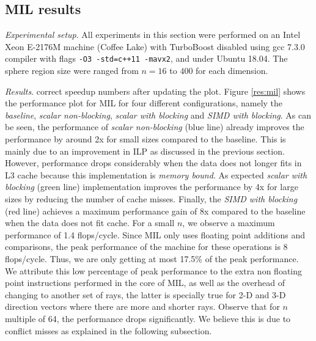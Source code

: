 \documentclass[letterpaper]{article}
\begin{document}
 

\subsection{MIL results} 
\textit{Experimental setup}. 
All experiments in this section were performed on an Intel Xeon E-2176M machine (Coffee Lake) with TurboBoost disabled using gcc 7.3.0 compiler with flags \texttt{-O3 -std=c++11 -mavx2}, and under Ubuntu 18.04. The sphere region size were ranged from $n=16$ to $400$ for each dimension.

\textit{Results}. 
{\color{red} correct speedup numbers after updating the plot.}
Figure \ref{res:mil} shows the performance plot for MIL for four different configurations, namely the \textit{baseline},\textit{ scalar non-blocking}, \textit{scalar with blocking} and \textit{SIMD with blocking}. As can be seen, the performance of \textit{scalar non-blocking} (blue line) already improves the performance by around {\color{red} 2x} for small sizes compared to the baseline. This is mainly due to an improvement in ILP as discussed in the previous section. However, performance drops considerably when the data does not longer fits in L3 cache because this implementation is \textit{memory bound}. As expected \textit{scalar with blocking} (green line) implementation improves the performance by {\color{red} 4x} for large sizes by reducing the number of cache misses. Finally, the \textit{SIMD with blocking} (red line) achieves a maximum performance gain of {\color{red} 8x} compared to the baseline when the data does not fit cache. For a small $n$, we observe a maximum performance of {\color{red} 1.4} flops/cycle. Since MIL only uses floating point additions and comparisons, the peak performance of the machine for these operations is 8 flops/cycle. Thus, we are only getting at most {\color{red} 17.5\%} of the peak performance. We attribute this low percentage of peak performance to the extra non floating point instructions performed in the core of MIL, as well as the overhead of changing to another set of rays, the latter is specially true for 2-D and 3-D direction vectors where there are more and shorter rays. Observe that for $n$ multiple of 64, the performance drops significantly. We believe this is due to conflict misses as explained in the following subsection.
\end{document}
